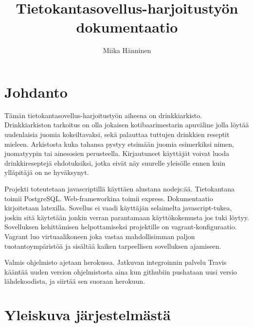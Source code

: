 \documentclass[a4paper]{article}
\title{Tietokantasovellus-harjoitustyön dokumentaatio}
\author{Miika Hänninen}
\begin{document}
\maketitle
\tableofcontents
\pagebreak

\section{Johdanto}
Tämän tietokantasovellus-harjoitustyön aiheena on drinkkiarkisto. Drinkkiarkiston tarkoitus on olla jokaisen kotibaarimestarin apuväline jolla löytää uudenlaisia juomia kokeiltavaksi, sekä palauttaa tuttujen drinkkien reseptit mieleen. Arkistosta kuka tahansa pystyy etsimään juomia esimerkiksi nimen, juomatyypin tai ainesosien perusteella. Kirjautuneet käyttäjät voivat luoda drinkkireseptejä ehdotuksiksi, jotka eivät näy suurelle yleisölle ennen kuin ylläpitäjä on ne hyväksynyt.

Projekti toteutetaan javascriptillä käyttäen alustana nodejs:ää. Tietokantana toimii PostgreSQL. Web-frameworkina toimii express. Dokumentaatio kirjoitetaan latexilla. Sovellus ei vaadi käyttäjän selaimelta javascript-tukea, joskin sitä käytetään jonkin verran parantamaan käyttökokemusta jos tuki löytyy. Sovelluksen kehittämisen helpottamiseksi projektille on vagrant-konfiguraatio. Vagrant luo virtuaalikoneen joka vastaa mahdollisimman paljon tuotantoympäristöä ja sisältää kaiken tarpeellisen sovelluksen ajamiseen. 

Valmis ohjelmisto ajetaan herokussa. Jatkuvan integroinnin palvelu Travis kääntää uuden version ohjelmistosta aina kun githubiin pushataan uusi versio lähdekoodista, ja siirtää sen suoraan herokuun.
\pagebreak

\section{Yleiskuva järjestelmästä}
\end{document}
